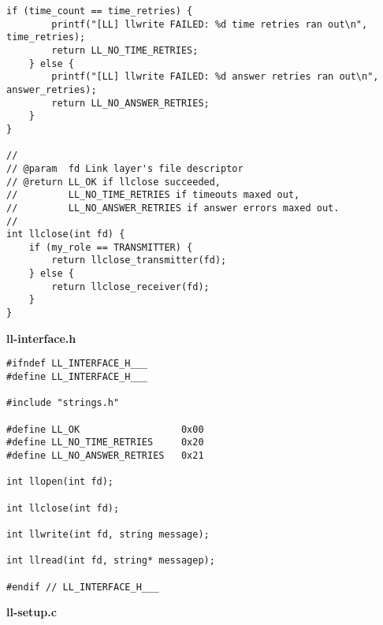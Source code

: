 \documentclass[subfiles]{main.tex}
\begin{document}
\begin{lstlisting}[style=rcom]
	if (time_count == time_retries) {
		printf("[LL] llwrite FAILED: %d time retries ran out\n", time_retries);
		return LL_NO_TIME_RETRIES;
	} else {
		printf("[LL] llwrite FAILED: %d answer retries ran out\n", answer_retries);
		return LL_NO_ANSWER_RETRIES;
	}
}

//
// @param  fd Link layer's file descriptor
// @return LL_OK if llclose succeeded,
//         LL_NO_TIME_RETRIES if timeouts maxed out,
//         LL_NO_ANSWER_RETRIES if answer errors maxed out.
//
int llclose(int fd) {
	if (my_role == TRANSMITTER) {
		return llclose_transmitter(fd);
	} else {
		return llclose_receiver(fd);
	}
}
\end{lstlisting}

{\Large\textbf{ll-interface.h}}

\begin{lstlisting}[style=rcom]
#ifndef LL_INTERFACE_H___
#define LL_INTERFACE_H___

#include "strings.h"

#define LL_OK                  0x00
#define LL_NO_TIME_RETRIES     0x20
#define LL_NO_ANSWER_RETRIES   0x21

int llopen(int fd);

int llclose(int fd);

int llwrite(int fd, string message);

int llread(int fd, string* messagep);

#endif // LL_INTERFACE_H___
\end{lstlisting}

{\Large\textbf{ll-setup.c}}
\end{document}
